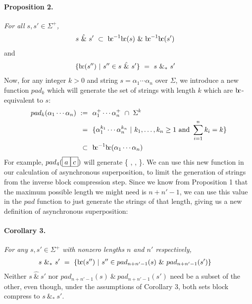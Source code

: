 \documentclass[a4paper,11pt]{article}
\newcommand{\bc}{{\rm b\!c}}
\newcommand{\vph}[1]{\vphantom{#1}}
\newcommand{\eboxl}[1]{\fbox{$\vph{'}#1$}}
\begin{document}
\paragraph{Proposition 2.} {\sl For all $s,s'\in \Sigma^+$,}
\begin{align*}
s\ \hat{\&}\ s' & \ \subset\ \bc^{-1}\bc(s)\ \&\ \bc^{-1}\bc(s')
\end{align*}
and
\begin{align*}
\{\bc(s'')\ | \ s''\in s\ \hat{\&}\ s'\}
& \ = \   s\ \&_*\ s'
\end{align*}
Now, for any integer $k > 0$ and string $s = \alpha_1\cdots\alpha_n$ over 
$\Sigma$, we introduce a new 
function 
$pad_k$ which will generate the set of strings with length $k$ which are 
$\bc$-equivalent to $s$:
\begin{align*}
pad_k(\alpha_1\cdots\alpha_n)~:=&~~\alpha_1^+\cdots\alpha_n^+\ \cap\ \Sigma^k \\
=&~~\{
\alpha_1^{k_1}\cdots\alpha_n^{k_n}\ | \
k_1,\ldots,k_n\geq 1
\mbox{ and } \sum_{i=1}^n k_i = k \}\\
\subset&~~\bc^{-1}\bc(\alpha_1\cdots\alpha_n)
\end{align*}
For example, $pad_{4}(\eboxl{a}\eboxl{c})$ will 
generate \{
\eboxl{a}\eboxl{a}\eboxl{a}\eboxl{c}, 
\eboxl{a}\eboxl{a}\eboxl{c}\eboxl{c}, 
\eboxl{a}\eboxl{c}\eboxl{c}\eboxl{c} \}. We 
can use this new function in our 
calculation of asynchronous superposition, to limit the generation of strings 
from the inverse block compression step. Since we know from Proposition 1 that 
the maximum possible 
length we might need is $n+n'-1$, we can use this value in the $pad$ function 
to just 
generate the strings of that length, giving us a new definition of asynchronous 
superposition:
\paragraph{Corollary 3.} {\sl For any $s,s'\in \Sigma^+$
	with nonzero lengths $n$ and $n'$ respectively,}
\begin{align*}
s \ \&_* \ s' & \ = \
\{\bc(s'')\ | \ s''\in pad_{n+n'-1}(s)\ \& \ pad_{n+n'-1}(s')\}
\end{align*}
Neither $s\ \hat{\&}\ s'$ nor $pad_{n+n'-1}(s)\ \& \ pad_{n+n'-1}(s')$
need be a subset of the other, even though,
under the assumptions of Corollary 3, 
both sets block compress to $s \ \&_* \ s'$.
\end{document}
